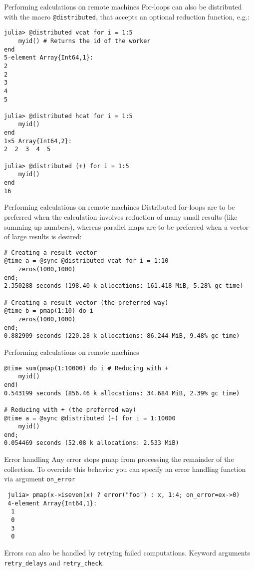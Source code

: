 \documentclass{beamer}
\begin{document}
\begin{frame}[fragile]{Performing calculations on remote machines}
For-loops can also be distributed with the macro \texttt{@distributed}, that accepts an optional reduction function, e.g.:
\begin{verbatim}
julia> @distributed vcat for i = 1:5
    myid() # Returns the id of the worker
end
5-element Array{Int64,1}:
2
2
3
4
5

julia> @distributed hcat for i = 1:5
    myid()
end
1×5 Array{Int64,2}:
2  2  3  4  5

julia> @distributed (+) for i = 1:5
    myid()
end
16
\end{verbatim}
\end{frame}


\begin{frame}[fragile]{Performing calculations on remote machines}
Distributed for-loops are to be preferred when the calculation involves reduction of many small results (like summing up numbers), whereas parallel maps are to be preferred when a vector of large results is desired:
\begin{verbatim}
# Creating a result vector
@time a = @sync @distributed vcat for i = 1:10
    zeros(1000,1000)
end;
2.350288 seconds (198.40 k allocations: 161.418 MiB, 5.28% gc time)

# Creating a result vector (the preferred way)
@time b = pmap(1:10) do i
    zeros(1000,1000)
end;
0.882909 seconds (220.28 k allocations: 86.244 MiB, 9.48% gc time)
\end{verbatim}
\end{frame}

\begin{frame}[fragile]{Performing calculations on remote machines}
\begin{verbatim}
@time sum(pmap(1:10000) do i # Reducing with +
    myid()
end)
0.543199 seconds (856.46 k allocations: 34.684 MiB, 2.39% gc time)

# Reducing with + (the preferred way)
@time a = @sync @distributed (+) for i = 1:10000
    myid()
end;
0.054469 seconds (52.08 k allocations: 2.533 MiB)
\end{verbatim}
\end{frame}


\begin{frame}[fragile]{Error handling}{}
    Any error stops pmap from processing the remainder of the collection. To override this behavior you can specify an error handling function via argument \verb+on_error+
\begin{verbatim}
 julia> pmap(x->iseven(x) ? error("foo") : x, 1:4; on_error=ex->0)
 4-element Array{Int64,1}:
  1
  0
  3
  0
\end{verbatim}
 Errors can also be handled by retrying failed computations. Keyword arguments \verb+retry_delays+ and \verb+retry_check+.
\end{frame}
\end{document}
